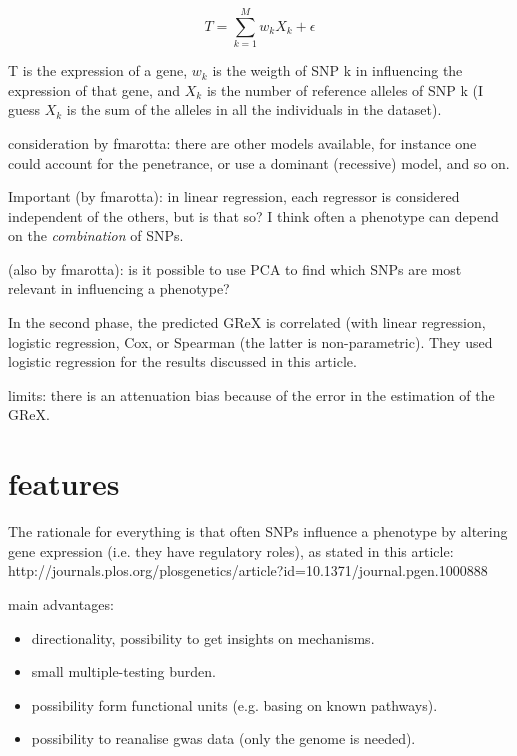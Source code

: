 \documentclass[../main.tex]{subfiles}
\begin{document}
\begin{equation}
	T = \sum_{k=1}^{M}{w_k X_k + \epsilon}
\end{equation}

T is the expression of a gene, $w_k$ is the weigth of SNP k in influencing the
expression of that gene, and $X_k$ is the number of reference alleles of SNP k
(I guess $X_k$ is the sum of the alleles in all the individuals in the
dataset).

consideration by fmarotta: there are other models available, for instance one
could account for the penetrance, or use a dominant (recessive) model, and so
on.

Important (by fmarotta): in linear regression, each regressor is considered
independent of the others, but is that so? I think often a phenotype can depend
on the \textit{combination} of SNPs.

(also by fmarotta): is it possible to use PCA to find which SNPs are most
relevant in influencing a phenotype?

In the second phase, the predicted GReX is correlated (with linear regression,
logistic regression, Cox, or Spearman (the latter is non-parametric). They used
logistic regression for the results discussed in this article.

limits: there is an attenuation bias because of the error in the estimation of
the GReX.

\section{features}

The rationale for everything is that often SNPs influence a phenotype by
altering gene expression (i.e. they have regulatory roles), as stated in this
article:
http://journals.plos.org/plosgenetics/article?id=10.1371/journal.pgen.1000888

main advantages:

\begin{itemize}
\item directionality, possibility to get insights on mechanisms.
\item small multiple-testing burden.
\item possibility form functional units (e.g. basing on known pathways).
\item possibility to reanalise gwas data (only the genome is needed).
\end{itemize}
\end{document}

